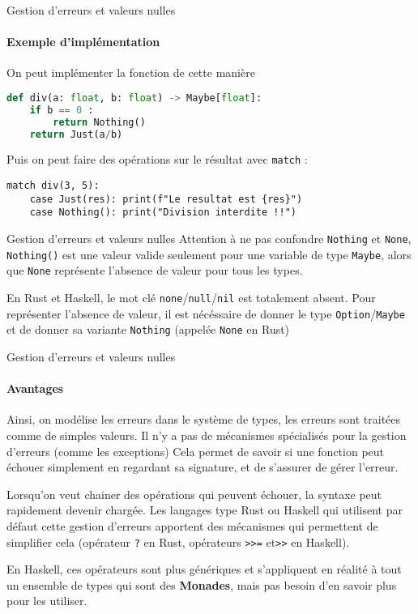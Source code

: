 \documentclass[aspectratio=169]{beamer}
\begin{document}
\begin{frame}[fragile]{Gestion d'erreurs et valeurs nulles}
    \framesubtitle{Exemple d'implémentation}
    On peut implémenter la fonction de cette manière
    \begin{lstlisting}[language=Python]
def div(a: float, b: float) -> Maybe[float]:
    if b == 0 :
        return Nothing()
    return Just(a/b)
    \end{lstlisting}

    Puis on peut faire des opérations sur le résultat avec \verb|match| :

    \begin{lstlisting}
match div(3, 5):
    case Just(res): print(f"Le resultat est {res}")
    case Nothing(): print("Division interdite !!")
    \end{lstlisting}


\end{frame}

\begin{frame}[fragile]{Gestion d'erreurs et valeurs nulles}
    Attention à ne pas confondre \verb|Nothing| et \verb|None|, \verb|Nothing()| est une valeur valide seulement pour une variable de type \verb|Maybe|, alors que \verb|None| représente l'absence de valeur pour tous les types.

    En Rust et Haskell, le mot clé \verb|none|/\verb|null|/\verb|nil| est totalement absent. Pour représenter l'absence de valeur, il est nécéssaire de donner le type \verb|Option|/\verb|Maybe| et de donner sa variante \verb|Nothing| (appelée \verb|None| en Rust)
\end{frame}

\begin{frame}[fragile]{Gestion d'erreurs et valeurs nulles}
    \framesubtitle{Avantages}
    Ainsi, on modélise les erreurs dans le système de types, les erreurs sont traitées comme de simples valeurs. Il n'y a pas de mécanismes spécialisés pour la gestion d'erreurs (comme les exceptions)
    Cela permet de savoir si une fonction peut échouer simplement en regardant sa signature, et de s'assurer de gérer l'erreur.

    Lorsqu'on veut chainer des opérations qui peuvent échouer, la syntaxe peut rapidement devenir chargée. Les langages type Rust ou Haskell qui utilisent par défaut cette gestion d'erreurs apportent des mécanismes qui permettent de simplifier cela (opérateur \verb|?| en Rust, opérateurs \verb|>>=| et\verb|>>| en Haskell).

    En Haskell, ces opérateurs sont plus génériques et s'appliquent en réalité à tout un ensemble de types qui sont des \textbf{Monades}, mais pas besoin d'en savoir plus pour les utiliser.
\end{frame}
\end{document}
